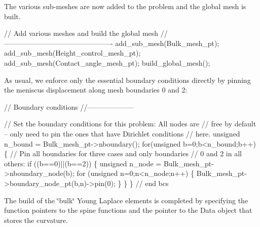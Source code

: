 The various sub-\/meshes are now added to the problem and the global mesh is built.


\begin{DoxyCodeInclude}


 \textcolor{comment}{// Add various meshes and build the global mesh}
 \textcolor{comment}{//----------------------------------------------}
 add\_sub\_mesh(Bulk\_mesh\_pt);
 add\_sub\_mesh(Height\_control\_mesh\_pt);
 add\_sub\_mesh(Contact\_angle\_mesh\_pt);
 build\_global\_mesh();

\end{DoxyCodeInclude}


As usual, we enforce only the essential boundary conditions directly by pinning the meniscus displacement along mesh boundaries 0 and 2\+:


\begin{DoxyCodeInclude}


 \textcolor{comment}{// Boundary conditions}
 \textcolor{comment}{//--------------------}

 \textcolor{comment}{// Set the boundary conditions for this problem: All nodes are}
 \textcolor{comment}{// free by default -- only need to pin the ones that have Dirichlet conditions}
 \textcolor{comment}{// here. }
 \textcolor{keywordtype}{unsigned} n\_bound = Bulk\_mesh\_pt->nboundary(); 
 \textcolor{keywordflow}{for}(\textcolor{keywordtype}{unsigned} b=0;b<n\_bound;b++)
  \{
   \textcolor{comment}{// Pin all boundaries for three cases and only boundaries}
   \textcolor{comment}{// 0 and 2 in all others:}
   \textcolor{keywordflow}{if} ((b==0)||(b==2))
    \{
     \textcolor{keywordtype}{unsigned} n\_node = Bulk\_mesh\_pt->nboundary\_node(b);
     \textcolor{keywordflow}{for} (\textcolor{keywordtype}{unsigned} n=0;n<n\_node;n++)
      \{
       Bulk\_mesh\_pt->boundary\_node\_pt(b,n)->pin(0); 
      \}
    \}
  \} \textcolor{comment}{// end bcs}

\end{DoxyCodeInclude}


The build of the \char`\"{}bulk\char`\"{} Young Laplace elements is completed by specifying the function pointers to the spine functions and the pointer to the {\ttfamily Data} object that stores the curvature.


